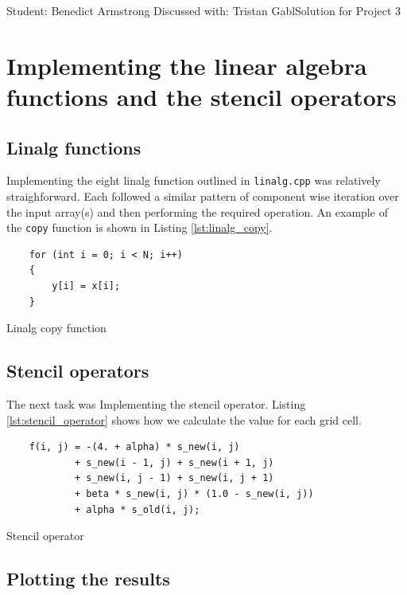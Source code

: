 \documentclass[unicode,11pt,a4paper,oneside,numbers=endperiod,openany]{scrartcl}
\begin{document}
\setassignment
{}

{Student: Benedict Armstrong}
{Discussed with: Tristan Gabl}{Solution for Project 3}{}
\newline


\section{Implementing the linear algebra functions and the stencil
  operators}

\subsection{Linalg functions}
Implementing the eight linalg function outlined in \texttt{linalg.cpp} was relatively straighforward. Each followed a similar pattern of component wise iteration over the input array(s) and then performing the required operation. An example of the \texttt{copy} function is shown in Listing \ref{lst:linalg_copy}.

\begin{listing}[h!t]
    \begin{verbatim}
    for (int i = 0; i < N; i++)
    {
        y[i] = x[i];
    }
    \end{verbatim}
    \caption{Linalg copy function}
    \label{lst:linalg_copy}
\end{listing}

\subsection{Stencil operators}

The next task was Implementing the stencil operator. Listing \ref*{lst:stencil_operator} shows how we calculate the value for each grid cell.

\begin{listing}[h!t]
    \begin{verbatim}
    f(i, j) = -(4. + alpha) * s_new(i, j) 
            + s_new(i - 1, j) + s_new(i + 1, j) 
            + s_new(i, j - 1) + s_new(i, j + 1) 
            + beta * s_new(i, j) * (1.0 - s_new(i, j)) 
            + alpha * s_old(i, j);
    \end{verbatim}
    \caption{Stencil operator}
    \label{lst:stencil_operator}
\end{listing}

\subsection{Plotting the results}
\end{document}
